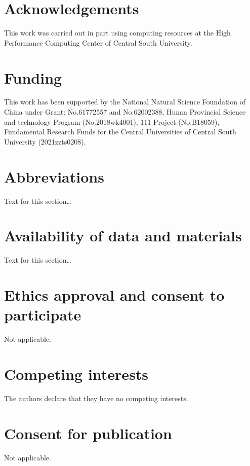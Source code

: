 \documentclass{bmcart}
\begin{document}

\begin{backmatter}

\section*{Acknowledgements}%
This work was carried out in part using computing resources at the High Performance Computing Center of Central South University.

\section*{Funding}%
This work has been supported by the National Natural Science Foundation of China under Grant: No.61772557 and No.62002388, Hunan Provincial Science and technology Program (No.2018wk4001), 111 Project (No.B18059), Fundamental Research Funds for the Central Universities of Central South University (2021zzts0208).

\section*{Abbreviations}%
Text for this section\ldots

\section*{Availability of data and materials}%
Text for this section\ldots

\section*{Ethics approval and consent to participate}%
Not applicable.

\section*{Competing interests}
The authors declare that they have no competing interests.

\section*{Consent for publication}%
Not applicable.


\end{backmatter}
\end{document}
